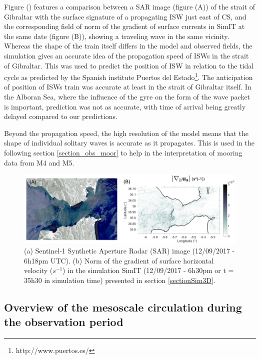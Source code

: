 Figure () features a comparison between a SAR image (figure (A)) of the strait of Gibraltar with the surface signature of a propagating ISW just east of CS, and the corresponding field of norm of the gradient of surface currents in SimIT at the same date (figure (B)), showing a traveling wave in the same vicinity. Whereas the shape of the train itself differs in the model and observed fields, the simulation gives an accurate idea of the propagation speed of ISWs in the strait of Gibraltar. This was used to predict the position of ISW in relation to the tidal cycle as predicted by the Spanish institute Puertos del Estado\footnote{http://www.puertos.es/}. The anticipation of position of ISWs train was accurate at least in the strait of Gibraltar itself. In the Alboran Sea, where the influence of the gyre on the form of the wave packet is important, prediction was not as accurate, with time of arrival being greatly delayed compared to our predictions. 

Beyond the propagation speed, the high resolution of the model means that the shape of individual solitary waves is accurate as it propagates. This is used in the following section \ref{section_obs_moor} to help in the interpretation of mooring data from M4 and M5.


\begin{figure}[!h]
 \includegraphics[width=\textwidth]{./GBR3D/Comp_SAR_IES.png}
 \caption[(A) Sentinel-1 SAR image. (B) Norm of the gradient of surface horizontal velocity in SimIT.] {(a) Sentinel-1 Synthetic Aperture Radar (SAR) image (12/09/2017 - 6h18pm UTC). (b) Norm of the gradient of surface horizontal velocity ($s^{-1}$) in the simulation SimIT (12/09/2017 - 6h30pm or t = 35h30 in simulation time) presented in section \ref{sectionSim3D}.}
 \label{fig_SARIES}
\end{figure}


\subsection{Overview of the mesoscale circulation during the observation period}

